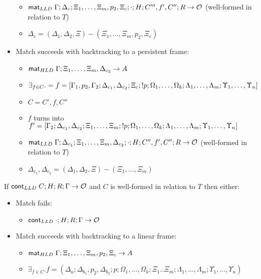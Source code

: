 \begin{lemma}
\begin{itemize}[leftmargin=*]
\begin{itemize}[leftmargin=\secondm]
      \item $\mathsf{mat}_{LLD} \; \Gamma; \Delta_c; \Xi_1, \dotsc, \Xi_m, p_2, \Xi_c; \cdot; H;
            C''', f', C''; R \rightarrow \mathcal{O}$ (well-formed in
                  relation to $T$)
      \item $\Delta_c = (\Delta_1, \Delta_2, \Xi) - (\Xi_1, \dotsc, \Xi_m, p_2, \Xi_c)$
   \end{itemize}

   \item Match succeeds with backtracking to a persistent frame:
   \begin{itemize}[leftmargin=\secondm]
      \item $\mathsf{mat}_{HLD} \; \Gamma; \Xi_1, \dotsc, \Xi_m, \Delta_{c_2} \rightarrow A$
      \item $\exists_{f \in C}. = f = [\Gamma_1, p_2, \Gamma_2; \Delta_{c_1}, \Delta_{c_2}; \Xi_c; {!}
         p; \Omega_1, \dotsc, \Omega_k; \Lambda_1, \dotsc, \Lambda_m;
         \Upsilon_1, \dotsc, \Upsilon_n]$
      \item $C = C', f, C''$
      \item $f$ turns into $f' = [\Gamma_2; \Delta_{c_1}, \Delta_{c_2}; \Xi_1, \dotsc,
         \Xi_m; {!} p; \Omega_1, \dotsc, \Omega_k; \Lambda_1, \dotsc,
         \Lambda_m; \Upsilon_1, \dotsc, \Upsilon_n]$
      \item $\mathsf{mat}_{LLD} \; \Gamma; \Delta_{c_1}; \Xi_1, \dotsc, \Xi_m, \Delta_{c_2};
         \cdot; H; C'', f', C''; R \rightarrow \mathcal{O}$ (well-formed in
            relation to $T$)
      \item $\Delta_{c_1}, \Delta_{c_2} = (\Delta_1, \Delta_2,
            \Xi) - (\Xi_1, \dotsc, \Xi_m)$
   \end{itemize}
\end{itemize}

If $\mathsf{cont}_{LLD} \; C; H; R; \Gamma \rightarrow \mathcal{O}$ and $C$ is well-formed in relation to $T$ then either:

\begin{itemize}[leftmargin=*]
   \item Match fails:
   \begin{itemize}[leftmargin=\secondm]
      \item $\mathsf{cont}_{LLD} \; \cdot; H; R; \Gamma \rightarrow \mathcal{O}$
   \end{itemize}

   \item Match succeeds with backtracking to a linear frame:
   \begin{itemize}[leftmargin=\secondm]
      \item $\mathsf{mat}_{HLD} \; \Gamma; \Xi_1, \dotsc, \Xi_m, p_2, \Xi_c \rightarrow A$
      \item $\exists_{f \in C}. f = (\Delta_a; \Delta_{b_1}, p_2, \Delta_{b_2}; p;
            \Omega_1, \dotsc, \Omega_k; \Xi_1 .. \Xi_m; \Lambda_1, \dotsc,
            \Lambda_m; \Upsilon_1, \dotsc, \Upsilon_n)$


\end{itemize}
\end{itemize}
\end{lemma}
